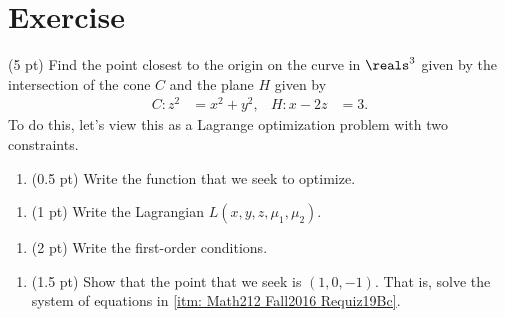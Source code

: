 \section{Exercise}

(5 pt) Find the point closest to the origin on the curve in $\reals^{3}$ given by the intersection of the cone $C$ and the plane $H$ given by
\begin{align*}
C:
z^{2}
&=
x^{2} + y^{2},
&
H:
x - 2 z
&=
3.
\end{align*}
To do this, let's view this as a Lagrange optimization problem with two constraints.
\begin{enumerate}[label=(\alph*)]
\item\label{itm: Math212 Fall2016 Requiz19Ba}  (0.5 pt) Write the function that we seek to optimize. 
\end{enumerate}

\spaceSolution{.5in}{%
}%



\begin{enumerate}[resume,label=(\alph*)]
\item (1 pt) Write the Lagrangian $L(x,y,z,\mu_{1},\mu_{2})$. 
\end{enumerate}

\spaceSolution{.25in}{%
}%



\begin{enumerate}[resume,label=(\alph*)]
\item\label{itm: Math212 Fall2016 Requiz19Bc} (2 pt) Write the first-order conditions. 
\end{enumerate}

\spaceSolution{1in}{%
}%



\begin{enumerate}[resume,label=(\alph*)]
\item (1.5 pt) Show that the point that we seek is $(1,0,-1)$. That is, solve the system of equations in \ref{itm: Math212 Fall2016 Requiz19Bc}. 
\end{enumerate}

\spaceSolution{4in}{%
}%